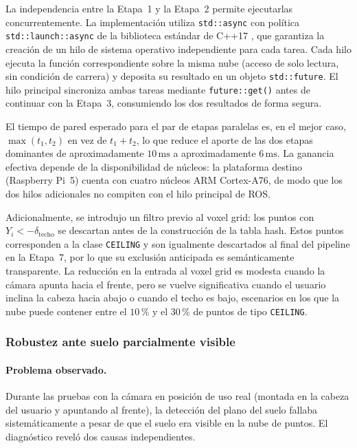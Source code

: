 La independencia entre la Etapa~1 y la Etapa~2 permite ejecutarlas
concurrentemente. La implementación utiliza \texttt{std::async} con política
\texttt{std::launch::async} de la biblioteca estándar de C++17
\cite{stroustrup2013cpp}, que garantiza la creación de un hilo de sistema
operativo independiente para cada tarea. Cada hilo ejecuta la función
correspondiente sobre la misma nube (acceso de solo lectura, sin condición de
carrera) y deposita su resultado en un objeto \texttt{std::future}. El hilo
principal sincroniza ambas tareas mediante \texttt{future::get()} antes de
continuar con la Etapa~3, consumiendo los dos resultados de forma segura.

El tiempo de pared esperado para el par de etapas paralelas es, en el
mejor caso, $\max(t_1, t_2)$ en vez de $t_1 + t_2$, lo que reduce el
aporte de las dos etapas dominantes de aproximadamente $10\,\text{ms}$ a
aproximadamente $6\,\text{ms}$. La ganancia efectiva depende de la
disponibilidad de núcleos: la plataforma destino (Raspberry Pi~5) cuenta
con cuatro núcleos ARM Cortex-A76, de modo que los dos hilos adicionales
no compiten con el hilo principal de ROS.

Adicionalmente, se introdujo un filtro previo al voxel grid: los puntos con
$Y_i < -\delta_{\text{techo}}$ se descartan antes de la construcción de la
tabla hash. Estos puntos corresponden a la clase \texttt{CEILING} y son
igualmente descartados al final del pipeline en la Etapa~7, por lo que su
exclusión anticipada es semánticamente transparente. La reducción en la
entrada al voxel grid es modesta cuando la cámara apunta hacia el frente,
pero se vuelve significativa cuando el usuario inclina la cabeza hacia abajo
o cuando el techo es bajo, escenarios en los que la nube puede contener
entre el $10\,$\% y el $30\,$\% de puntos de tipo \texttt{CEILING}.

\subsubsection{Robustez ante suelo parcialmente visible}
\label{subsec:lm-v3-ground-robustness}

\paragraph{Problema observado.}
Durante las pruebas con la cámara en posición de uso real (montada en la
cabeza del usuario y apuntando al frente), la detección del plano del suelo
fallaba sistemáticamente a pesar de que el suelo era visible en la nube de
puntos. El diagnóstico reveló dos causas independientes.

